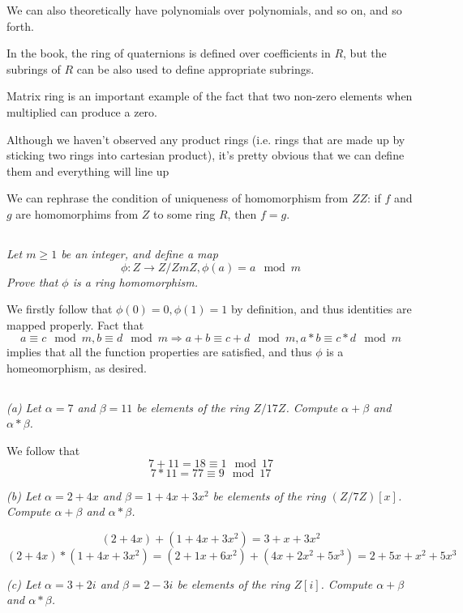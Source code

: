 \documentclass[11pt,oneside,titlepage]{book}
\DeclareMathOperator \ra {\Rightarrow}
\begin{document}
We can also theoretically have polynomials over polynomials, and so on,
and so forth.

In the book, the ring of quaternions is defined over coefficients in
$R$, but the subrings of $R$ can be also used to define appropriate
subrings.

Matrix ring is an important example of the fact that two non-zero
elements when multiplied can produce a zero.

Although we haven't observed any product rings (i.e. rings that are
made up by sticking two rings into cartesian product), it's pretty
obvious that we can define them and everything will line up

We can rephrase the condition of uniqueness of homomorphism from $ZZ$:
if $f$ and $g$ are homomorphims from $Z$ to some ring $R$, then $f =
g$.


\subsection{}

\textit{Let $m \geq 1$ be an integer, and define a map
  $$\phi: Z \to Z/ZmZ, \phi(a) = a \mod m$$
  Prove that $\phi$ is a ring homomorphism.}

We firstly follow that $\phi(0) = 0, \phi(1) = 1$ by definition, and
thus identities are mapped properly. Fact that
$$a \equiv c \mod m, b \equiv d \mod m \ra a + b \equiv c + d \mod m, a * b \equiv c * d \mod m$$
implies that all the function properties are satisfied, and thus $\phi$ is a
homeomorphism, as desired.

\subsection{}

\textit{(a) Let $\alpha = 7$ and $\beta = 11$ be elements of the ring
  $Z/17Z$. Compute $\alpha + \beta$ and $\alpha * \beta$.}

We follow that
$$7 + 11 = 18 \equiv 1 \mod 17$$
$$7 * 11 = 77 \equiv 9 \mod 17$$

\textit{(b) Let $\alpha = 2 + 4x$ and $\beta = 1 + 4x + 3x^2$ be
  elements of the ring $(Z/7Z)[x]$. Compute $\alpha + \beta$ and $\alpha *
  \beta$.}

$$(2 + 4x) + (1 + 4x + 3x^2) = 3 + x + 3x^2$$
$$(2 + 4x) * (1 + 4x + 3x^2) = (2 + 1x + 6x^2) + (4x + 2x^2 + 5x^3) = 2 + 5x + x^2 + 5x^3$$

\textit{(c) Let $\alpha = 3 + 2i$ and $\beta = 2 - 3i$ be
  elements of the ring $Z[i]$. Compute $\alpha + \beta$ and $\alpha *
  \beta$.}
\end{document}
